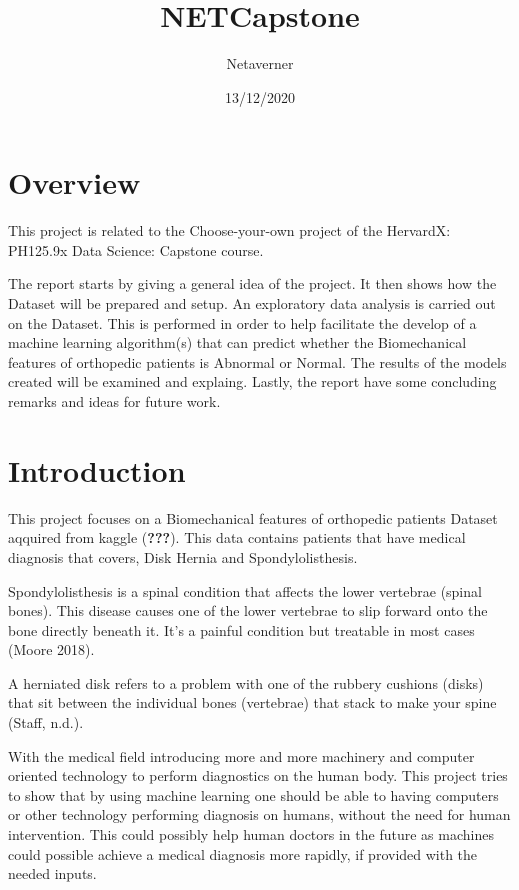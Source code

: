 \documentclass[
]{article}
\title{NETCapstone}
\author{Netaverner}
\date{13/12/2020}
\begin{document}
\maketitle

\hypertarget{overview}{%
\section{Overview}\label{overview}}

This project is related to the Choose-your-own project of the HervardX:
PH125.9x Data Science: Capstone course.

The report starts by giving a general idea of the project. It then shows
how the Dataset will be prepared and setup. An exploratory data analysis
is carried out on the Dataset. This is performed in order to help
facilitate the develop of a machine learning algorithm(s) that can
predict whether the Biomechanical features of orthopedic patients is
Abnormal or Normal. The results of the models created will be examined
and explaing. Lastly, the report have some concluding remarks and ideas
for future work.

\hypertarget{introduction}{%
\section{Introduction}\label{introduction}}

This project focuses on a Biomechanical features of orthopedic patients
Dataset aqquired from kaggle ({\textbf{???}}). This data contains
patients that have medical diagnosis that covers, Disk Hernia and
Spondylolisthesis.

Spondylolisthesis is a spinal condition that affects the lower vertebrae
(spinal bones). This disease causes one of the lower vertebrae to slip
forward onto the bone directly beneath it. It's a painful condition but
treatable in most cases (Moore 2018).

A herniated disk refers to a problem with one of the rubbery cushions
(disks) that sit between the individual bones (vertebrae) that stack to
make your spine (Staff, n.d.).

With the medical field introducing more and more machinery and computer
oriented technology to perform diagnostics on the human body. This
project tries to show that by using machine learning one should be able
to having computers or other technology performing diagnosis on humans,
without the need for human intervention. This could possibly help human
doctors in the future as machines could possible achieve a medical
diagnosis more rapidly, if provided with the needed inputs.
\end{document}
